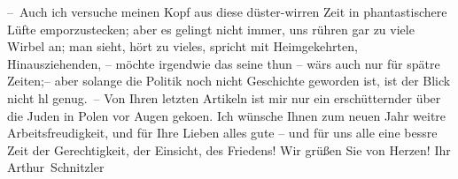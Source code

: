 \pstart
           – Auch ich versuche meinen Kopf aus diese düster-wirren Zeit in phantastischere Lüfte
               emporzustecken; aber es gelingt nicht immer, uns rühren gar zu viele Wirbel an; man
               sieht, hört zu vieles, spricht mit Heimgekehrten, Hinausziehenden, – möchte irgendwie
               das seine thun – wärs auch nur für spätre Zeiten;– aber solange die Politik noch
               nicht Geschichte  geworden ist, ist der Blick
               nicht hl {\pb}genug. – Von Ihren letzten Artikeln
               ist mir nur ein erschütternder
               über die Juden in Polen vor Augen geko{\geminationm}en. Ich wünsche Ihnen zum neuen Jahr weitre
               Arbeitsfreudigkeit, und für Ihre Lieben alles gute – und für uns alle eine bessre
               Zeit der Gerechtigkeit, der Einsicht, des Friedens! Wir grüßen Sie von Herzen! Ihr
                  \spacefill\mbox{Arthur Schnitzler}\pend
           \endnumbering{}  
      